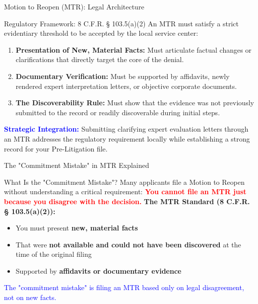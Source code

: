 \documentclass[11pt]{beamer}
\begin{document}
	
	\begin{frame}{Motion to Reopen (MTR): Legal Architecture}
		\scriptsize
		\begin{block}{Regulatory Framework: 8 C.F.R. § 103.5(a)(2)}
			An MTR must satisfy a strict evidentiary threshold to be accepted by the local service center:
			\begin{enumerate}
				\item \textbf{Presentation of New, Material Facts:} Must articulate factual changes or clarifications that directly target the core of the denial.
				\item \textbf{Documentary Verification:} Must be supported by affidavits, newly rendered expert interpretation letters, or objective corporate documents.
				\item \textbf{The Discoverability Rule:} Must show that the evidence was not previously submitted to the record or readily discoverable during initial steps.
			\end{enumerate}
			\vspace{0.1cm}
			\textcolor{blue}{\textbf{Strategic Integration:}} Submitting clarifying expert evaluation letters through an MTR addresses the regulatory requirement locally while establishing a strong record for your Pre-Litigation file.
		\end{block}
	\end{frame}
	
	\begin{frame}{The "Commitment Mistake" in MTR Explained}
		\scriptsize
		\begin{block}{What Is the "Commitment Mistake"?}
			Many applicants file a Motion to Reopen without understanding a critical requirement:
			\vspace{0.2cm}
			\textcolor{red}{\textbf{You cannot file an MTR just because you disagree with the decision.}}
			\vspace{0.2cm}
			\textbf{The MTR Standard (8 C.F.R. § 103.5(a)(2)):}
			\begin{itemize}
				\item You must present \textbf{new, material facts}
				\item That were \textbf{not available and could not have been discovered} at the time of the original filing
				\item Supported by \textbf{affidavits or documentary evidence}
			\end{itemize}
			\textcolor{blue}{The "commitment mistake" is filing an MTR based only on legal disagreement, not on new facts.}
		\end{block}
	\end{frame}
	
\end{document}
